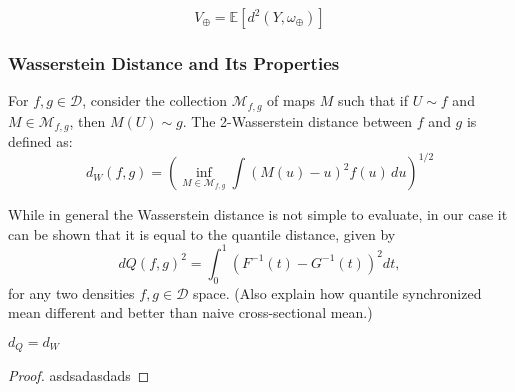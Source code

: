 \begin{equation}
    V_\oplus = \mathbb{E} \left[ d^2(Y, \omega_\oplus) \right]
\end{equation}

\subsubsection{Wasserstein Distance and Its Properties}
\label{sec:wasserstein_distance}
\begin{definition}
    \label{def:wasserstein_2_dist}
    For \( f, g \in \mathcal{D} \), consider the collection \( \mathcal{M}_{f,g} \) of maps \( M \)
    such that if \( U \sim f \) and \( M \in \mathcal{M}_{f,g} \), then \( M(U) \sim g \).
    The 2-Wasserstein distance between \( f \) and \( g \) is defined as:
    \[
    d_W(f, g) = \left( \inf_{M \in \mathcal{M}_{f,g}} \int (M(u) - u)^2 f(u) \, du \right)^{1/2}
    \]
\end{definition}
While in general the Wasserstein distance is not simple to evaluate, in our case it can
be shown that it is equal to the quantile distance, given by
\[
dQ(f, g)^2 = \int_{0}^{1} (F^{-1}(t) - G^{-1}(t))^2 dt,
\]
for any two densities $f, g \in \mathcal{D}$ space. (Also explain how quantile
synchronized mean different and better than naive cross-sectional mean.)
\begin{lemma}
    \label{lemma:dqeqdw}
    $d_Q = d_W$
\end{lemma}
\begin{proof}
    asdsadasdads
\end{proof}

